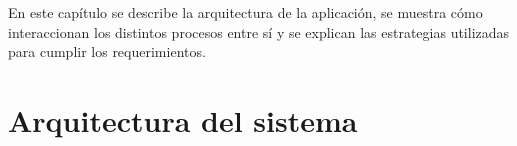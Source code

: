 En este capítulo se describe la arquitectura de la aplicación, se muestra cómo interaccionan los distintos procesos entre sí y se explican las estrategias utilizadas para cumplir los requerimientos.

\section{Arquitectura del sistema}
\label{subsec:ArqSistema}

%
%
%
%
%
%
%
%


